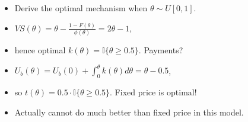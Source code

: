 \documentclass[english,handout]{beamer}		%
\def\lyxframeend{} %
\begin{document}
\begin{itemize}[<+->]
	\item Derive the optimal mechanism when $\theta \sim U[0,1]$.
	\item $VS(\theta) = \theta - \frac{1-F(\theta)}{\phi(\theta)} = 2 \theta - 1$,
	\item hence optimal $k(\theta) = \mathbb{I} \{\theta \geq 0.5 \}$. Payments?
	\item $U_b (\theta) = U_b(0) + \int_0^\theta k(\theta) d\theta = \theta - 0.5$,
	\item so $t(\theta) = 0.5 \cdot \mathbb{I} \{\theta \geq 0.5 \}$. Fixed price is optimal!
	\item Actually cannot do much better than fixed price in this model.
\end{itemize}
\lyxframeend


%
%
%
%
%
\end{document}
